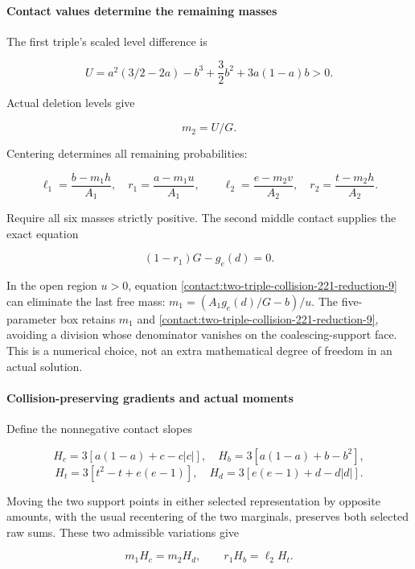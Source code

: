 \paragraph{Contact values determine the remaining masses}

The first triple's scaled level difference is

\[
 U=a^2(3/2-2a)-b^3+\frac32b^2+3a(1-a)b>0.
\tag{B.31.6}\label{contact:two-triple-collision-221-reduction-6}
\]

Actual deletion levels give

\[
 \boxed{m_2=U/G.}
\tag{B.31.7}\label{contact:two-triple-collision-221-reduction-7}
\]

Centering determines all remaining probabilities:

\[
 \ell_1=\frac{b-m_1h}{A_1},\quad
 r_1=\frac{a-m_1u}{A_1},\qquad
 \ell_2=\frac{e-m_2v}{A_2},\quad
 r_2=\frac{t-m_2h}{A_2}.
\tag{B.31.8}\label{contact:two-triple-collision-221-reduction-8}
\]

Require all six masses strictly positive. The second middle contact supplies
the exact equation

\[
 \boxed{(1-r_1)G-g_e(d)=0.}
\tag{B.31.9}\label{contact:two-triple-collision-221-reduction-9}
\]

In the open region $u>0$, equation \eqref{contact:two-triple-collision-221-reduction-9} can eliminate the last free mass:
$m_1=(A_1 g_e(d)/G-b)/u$. The five-parameter box retains $m_1$ and
\eqref{contact:two-triple-collision-221-reduction-9}, avoiding a division whose denominator vanishes on the coalescing-support
face. This is a numerical choice, not an extra mathematical degree of freedom
in an actual solution.

\paragraph{Collision-preserving gradients and actual moments}

Define the nonnegative contact slopes

\[
 H_c=3[a(1-a)+c-c|c|],\quad H_b=3[a(1-a)+b-b^2],
\]
\[
 H_t=3[t^2-t+e(e-1)],\quad H_d=3[e(e-1)+d-d|d|].
\tag{B.31.10}\label{contact:two-triple-collision-221-reduction-10}
\]

Moving the two support points in either selected representation by opposite
amounts, with the usual recentering of the two marginals, preserves both
selected raw sums. These two admissible variations give

\[
 \boxed{m_1H_c=m_2H_d,\qquad r_1H_b=\ell_2H_t.}
\tag{B.31.11}\label{contact:two-triple-collision-221-reduction-11}
\]

